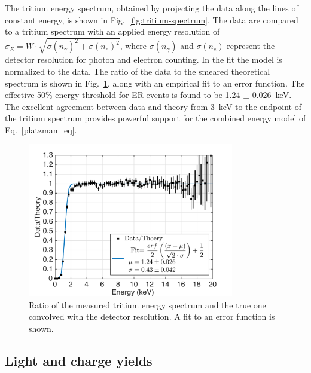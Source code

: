 The tritium energy spectrum, obtained by projecting the data along the lines of constant energy, is shown in Fig.~\ref{fig:tritium-spectrum}. The data are compared to a tritium spectrum with an applied energy resolution of $ \sigma_E = W \cdot \sqrt{\sigma(n_{\gamma})^2 + \sigma(n_e)^2}$, where $ \sigma(n_{\gamma})$ and $ \sigma(n_e)$ represent the detector resolution for photon and electron counting. In the fit the model is normalized to the data. The ratio of the data to the smeared theoretical spectrum is shown in Fig.~\ref{fig:ER-threshold}, along with an empirical fit to an error function. The effective 50\% energy threshold for ER events is found to be 1.24 $\pm$ 0.026~keV. The excellent agreement between data and theory from 3~keV to the endpoint of the tritium spectrum provides powerful support for the combined energy model of Eq.~\ref{platzman_eq}.

\begin{figure}[t!]
\includegraphics[width=90mm]{fig6.pdf}
\caption{Ratio of the measured tritium energy spectrum and the true one convolved with the detector resolution. A fit to an error function is shown.}
\label{fig:ER-threshold}
\end{figure}

\subsection{Light and charge yields}


